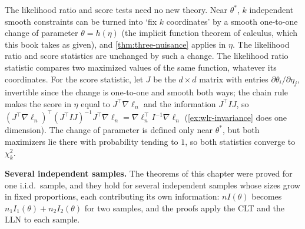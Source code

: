 The likelihood ratio and score tests need no new theory.
Near $\theta^*$, $k$ independent smooth constraints can be turned into `fix $k$ coordinates' by a smooth one-to-one change of parameter $\theta = h(\eta)$ (the implicit function theorem of calculus, which this book takes as given), and \cref{thm:three-nuisance} applies in $\eta$.
The likelihood ratio and score statistics are unchanged by such a change.
The likelihood ratio statistic compares two maximized values of the same function, whatever its coordinates.
For the score statistic, let $J$ be the $d \times d$ matrix with entries $\partial\theta_i/\partial\eta_j$, invertible since the change is one-to-one and smooth both ways; the chain rule makes the score in $\eta$ equal to $J^\top\nabla\ell_n$ and the information $J^\top IJ$, so $(J^\top\nabla\ell_n)^\top(J^\top IJ)^{-1}J^\top\nabla\ell_n = \nabla\ell_n^\top I^{-1}\nabla\ell_n$ (\cref{ex:wlr-invariance} does one dimension).
The change of parameter is defined only near $\theta^*$, but both maximizers lie there with probability tending to $1$, so both statistics converge to $\chi^2_k$.

\textbf{Several independent samples.}
The theorems of this chapter were proved for one i.i.d.\ sample, and they hold for several independent samples whose sizes grow in fixed proportions, each contributing its own information: $nI(\theta)$ becomes $n_1I_1(\theta) + n_2I_2(\theta)$ for two samples, and the proofs apply the CLT and the LLN to each sample.

